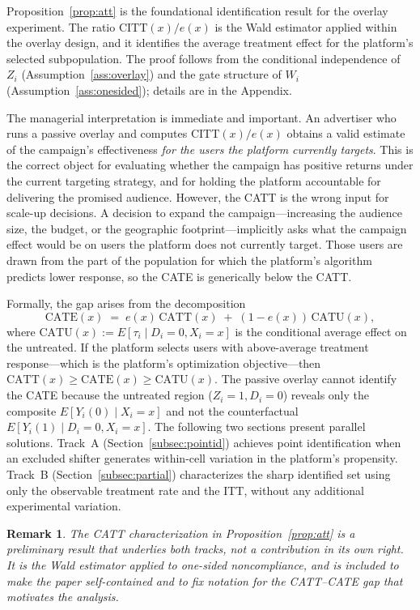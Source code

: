 \documentclass[11pt]{article}
\newtheorem{remark}{Remark}
\begin{document}
Proposition~\ref{prop:att} is the foundational identification result for the
overlay experiment.  The ratio $\mathrm{CITT}(x)/e(x)$ is the Wald estimator
applied within the overlay design, and it identifies the average treatment effect
for the platform's selected subpopulation.  The proof follows from the
conditional independence of $Z_i$ (Assumption~\ref{ass:overlay}) and the gate
structure of $W_i$ (Assumption~\ref{ass:onesided}); details are in the
Appendix.

The managerial interpretation is immediate and important.  An advertiser who
runs a passive overlay and computes $\mathrm{CITT}(x)/e(x)$ obtains a valid
estimate of the campaign's effectiveness \emph{for the users the platform
currently targets}.  This is the correct object for evaluating whether the
campaign has positive returns under the current targeting strategy, and for
holding the platform accountable for delivering the promised audience.  However,
the CATT is the wrong input for scale-up decisions.  A decision to expand the
campaign---increasing the audience size, the budget, or the geographic
footprint---implicitly asks what the campaign effect would be on users the
platform does not currently target.  Those users are drawn from the part of the
population for which the platform's algorithm predicts lower response, so the
CATE is generically below the CATT.

Formally, the gap arises from the decomposition
\[
  \mathrm{CATE}(x) \;=\; e(x)\,\mathrm{CATT}(x) \;+\; (1-e(x))\,\mathrm{CATU}(x),
\]
where $\mathrm{CATU}(x) := E[\tau_i \mid D_i=0, X_i=x]$ is the conditional
average effect on the untreated.  If the platform selects users with
above-average treatment response---which is the platform's optimization
objective---then $\mathrm{CATT}(x) \geq \mathrm{CATE}(x) \geq \mathrm{CATU}(x)$.
The passive overlay cannot identify the CATE because the untreated
region ($Z_i=1, D_i=0$) reveals only the composite $E[Y_i(0) \mid X_i=x]$
and not the counterfactual $E[Y_i(1) \mid D_i=0, X_i=x]$.  The following two
sections present parallel solutions.  Track~A (Section~\ref{subsec:pointid})
achieves point identification when an excluded shifter generates within-cell
variation in the platform's propensity.  Track~B (Section~\ref{subsec:partial})
characterizes the sharp identified set using only the observable treatment rate
and the ITT, without any additional experimental variation.

\begin{remark}
  The CATT characterization in Proposition~\ref{prop:att} is a preliminary
  result that underlies both tracks, not a contribution in its own right.  It
  is the Wald estimator applied to one-sided noncompliance, and is included to
  make the paper self-contained and to fix notation for the CATT--CATE gap
  that motivates the analysis.
\end{remark}
\end{document}
